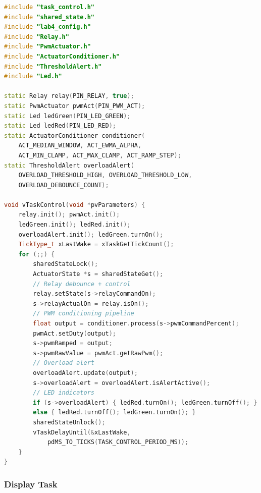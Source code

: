 \begin{lstlisting}[language=C++, caption=task\_control.cpp --- Actuator control task, label=lst:task_control_cpp]
#include "task_control.h"
#include "shared_state.h"
#include "lab4_config.h"
#include "Relay.h"
#include "PwmActuator.h"
#include "ActuatorConditioner.h"
#include "ThresholdAlert.h"
#include "Led.h"

static Relay relay(PIN_RELAY, true);
static PwmActuator pwmAct(PIN_PWM_ACT);
static Led ledGreen(PIN_LED_GREEN);
static Led ledRed(PIN_LED_RED);
static ActuatorConditioner conditioner(
    ACT_MEDIAN_WINDOW, ACT_EWMA_ALPHA,
    ACT_MIN_CLAMP, ACT_MAX_CLAMP, ACT_RAMP_STEP);
static ThresholdAlert overloadAlert(
    OVERLOAD_THRESHOLD_HIGH, OVERLOAD_THRESHOLD_LOW,
    OVERLOAD_DEBOUNCE_COUNT);

void vTaskControl(void *pvParameters) {
    relay.init(); pwmAct.init();
    ledGreen.init(); ledRed.init();
    overloadAlert.init(); ledGreen.turnOn();
    TickType_t xLastWake = xTaskGetTickCount();
    for (;;) {
        sharedStateLock();
        ActuatorState *s = sharedStateGet();
        // Relay debounce + control
        relay.setState(s->relayCommandOn);
        s->relayActualOn = relay.isOn();
        // PWM conditioning pipeline
        float output = conditioner.process(s->pwmCommandPercent);
        pwmAct.setDuty(output);
        s->pwmRamped = output;
        s->pwmRawValue = pwmAct.getRawPwm();
        // Overload alert
        overloadAlert.update(output);
        s->overloadAlert = overloadAlert.isAlertActive();
        // LED indicators
        if (s->overloadAlert) { ledRed.turnOn(); ledGreen.turnOff(); }
        else { ledRed.turnOff(); ledGreen.turnOn(); }
        sharedStateUnlock();
        vTaskDelayUntil(&xLastWake,
            pdMS_TO_TICKS(TASK_CONTROL_PERIOD_MS));
    }
}
\end{lstlisting}

\subsubsection{Display Task}

